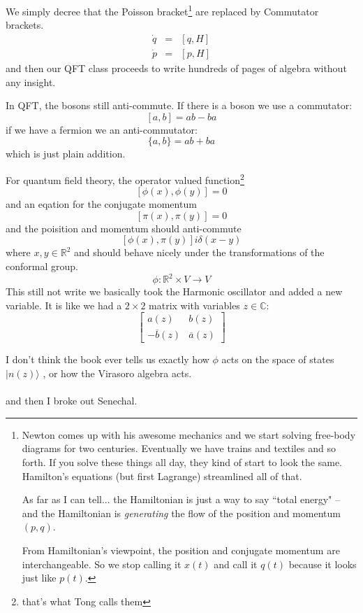 \documentclass[12pt]{article}
\begin{document}
 We simply decree that the Poisson bracket\footnote{Newton comes up with his awesome mechanics and we start solving free-body diagrams for two centuries.  Eventually we have trains and textiles and so forth.  If you solve these things all day, they kind of start to look the same.  Hamilton's equations (but first Lagrange) streamlined all of that.
 
As far as I can tell... the Hamiltonian is just a way to say ``total energy" -- and the Hamiltonian is \textit{generating} the flow of the position and momentum $(p,q)$.

From Hamiltonian's viewpoint, the position and conjugate momentum are interchangeable.  So we stop calling it $x(t)$ and call it $q(t)$ because it looks just like $p(t)$. } are replaced by Commutator brackets. 
\begin{eqnarray*} \dot{q} &=& [ q, H  ] \\  
\dot{p} &=&  [ p, H  ]  \end{eqnarray*}
and then our QFT class proceeds to write hundreds of pages of algebra without any insight.  \newpage

In QFT, the bosons still anti-commute.  If there is a boson we use a commutator:
$$ [a,b] = ab - ba $$
if we have a fermion we an anti-commutator:
$$ \{ a, b\} = ab + ba $$
which is just plain addition.

\newpage

\noindent For quantum field theory, the operator valued function\footnote{that's what Tong calls them}
$$ [\phi(x), \phi(y)] = 0 $$
and an eqation for the conjugate momentum 
$$ [\pi(x), \pi(y) ] = 0 $$
and the poisition and momentum should anti-commute
$$ [\phi(x), \pi(y) ] i \delta(x-y)$$
where $x, y \in \mathbb{R}^2$ and should behave nicely under the transformations of the conformal group.
$$ \phi: \mathbb{R}^2 \times V \to V $$
This still not write we basically took the Harmonic oscillator and added a new variable.  It is like we had a $2\times 2 $ matrix with variables $z \in \mathbb{C}$:
$$\left[ \begin{array}{rc} 
a(z) & b(z) \\ -\overline{b}(z) & \overline{a}(z) \end{array} \right]$$
\newpage

\noindent I don't think the book ever tells us exactly how $\phi$ acts on the space of states $|n(z) \rangle$ , or how the Virasoro algebra acts. \\ \\
and then I broke out Senechal.
\end{document}
